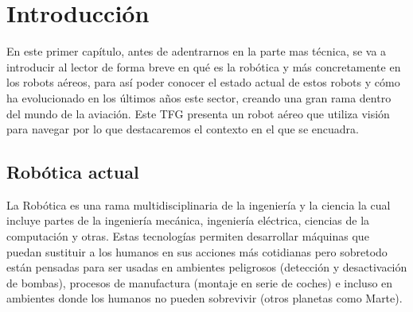 \chapter{Introducción}\label{cap.introduccion}
\hspace{1cm} En este primer capítulo, antes de adentrarnos en la parte mas técnica, se va a introducir al lector de forma breve en qué es la robótica y más concretamente en los robots aéreos, para así poder conocer el estado actual de estos robots y cómo ha evolucionado en los últimos años este sector, creando una gran rama dentro del mundo de la aviación. Este TFG presenta un robot aéreo que utiliza visión para navegar por lo que destacaremos el contexto en el que se encuadra.

\section{Robótica actual}
\hspace{1cm} La Robótica es una rama multidisciplinaria de la ingeniería y la ciencia la cual incluye partes de la ingeniería mecánica, ingeniería eléctrica, ciencias de la computación y otras. Estas tecnologías permiten desarrollar máquinas que puedan sustituir a los humanos en sus acciones más cotidianas pero sobretodo están pensadas para ser usadas en ambientes peligrosos (detección y desactivación de bombas), procesos de manufactura (montaje en serie de coches) e incluso en ambientes donde los humanos no pueden sobrevivir (otros planetas como Marte).

